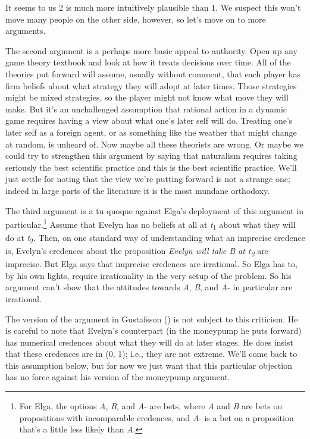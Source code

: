 \documentclass[
  11pt,
  letterpaper,
  DIV=11,
  numbers=noendperiod,
  twoside]{scrartcl}
\begin{document}
It seems to us 2 is much more intuitively plausible than 1. We suspect
this won't move many people on the other side, however, so let's move on
to more arguments.

The second argument is a perhaps more basic appeal to authority. Open up
any game theory textbook and look at how it treats decisions over time.
All of the theories put forward will assume, usually without comment,
that each player has firm beliefs about what strategy they will adopt at
later times. Those strategies might be mixed strategies, so the player
might not know what move they will make. But it's an unchallenged
assumption that rational action in a dynamic game requires having a view
about what one's later self will do. Treating one's later self as a
foreign agent, or as something like the weather that might change at
random, is unheard of. Now maybe all these theorists are wrong. Or maybe
we could try to strengthen this argument by saying that naturalism
requires taking seriously the best scientific practice and this is the
best scientific practice. We'll just settle for noting that the view
we're putting forward is not a strange one; indeed in large parts of the
literature it is the most mundane orthodoxy.

The third argument is a tu quoque against Elga's deployment of this
argument in particular.\footnote{For Elga, the options \emph{A},
  \emph{B}, and \emph{A}- are bets, where \emph{A} and \emph{B} are bets
  on propositions with incomparable credences, and \emph{A}- is a bet on
  a proposition that's a little less likely than \emph{A}.} Assume that
Evelyn has no beliefs at all at \emph{t}\textsubscript{1} about what
they will do at \emph{t}\textsubscript{2}. Then, on one standard way of
understanding what an imprecise credence is, Evelyn's credences about
the proposition \emph{Evelyn will take B at t\textsubscript{2}} are
imprecise. But Elga says that imprecise credences are irrational. So
Elga has to, by his own lights, require irrationality in the very setup
of the problem. So his argument can't show that the attitudes towards
\emph{A}, \emph{B}, and \emph{A}- in particular are irrational.

The version of the argument in Gustafsson
() is not subject to this
criticism. He is careful to note that Evelyn's counterpart (in the
moneypump he puts forward) has numerical credences about what they will
do at later stages. He does insist that these credences are in (0, 1);
i.e., they are not extreme. We'll come back to this assumption below,
but for now we just want that this particular objection has no force
against his version of the moneypump argument.
\end{document}
